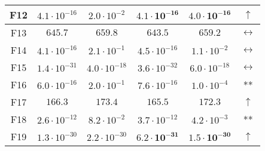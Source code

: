 \begin{table*}[!t]
\begin{scriptsize}
\begin{tabular}{c || c c | c c c}
F12 & $4.1 \cdot 10^{-16}$ & $2.0 \cdot 10^{-2}$   & $\mathbf{4.1 \cdot 10^{-16}}$ & $\mathbf{4.0 \cdot 10^{-16}}$ & $\uparrow$        \\ \hline
F13 & $645.7$              & $659.8$               & $643.5$                       & $659.2$                       & $\leftrightarrow$ \\ \hline
F14 & $4.1 \cdot 10^{-16}$ & $2.1 \cdot 10^{-1}$   & $4.5 \cdot 10^{-16}$          & $1.1 \cdot 10^{-2}$           & $\leftrightarrow$ \\ \hline
F15 & $1.4 \cdot 10^{-31}$ & $4.0 \cdot 10^{-18}$  & $3.6 \cdot 10^{-32}$          & $6.0 \cdot 10^{-18}$          & $\leftrightarrow$ \\ \hline
F16 & $6.0 \cdot 10^{-16}$ & $2.0 \cdot 10^{-1}$   & $7.6 \cdot 10^{-16}$          & $1.0 \cdot 10^{-4}$           & **                \\ \hline
F17 & $166.3$              & $173.4$               & $\mathbf{165.5}$              & $\mathbf{172.3}$              & $\uparrow$        \\ \hline
F18 & $2.6 \cdot 10^{-12}$ & $8.2 \cdot 10^{-2}$   & $3.7 \cdot 10^{-12}$          & $4.2 \cdot 10^{-3}$           & **                \\ \hline
F19 & $1.3 \cdot 10^{-30}$ & $2.2 \cdot 10^{-30}$  & $\mathbf{6.2 \cdot 10^{-31}}$ & $\mathbf{1.5 \cdot 10^{-30}}$ & $\uparrow$        \\ \hline
\end{tabular}
\end{scriptsize}
\end{table*}
